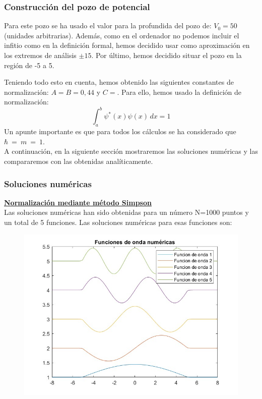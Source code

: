 \documentclass[12pt]{article}
\begin{document}
\subsubsection{Construcción del pozo de potencial}
Para este pozo se ha usado el valor para la profundida del pozo
de: $V_0=50$ (unidades arbitrarias). Además, como en el ordenador
no podemos incluir el infitio como en la definición formal, hemos 
decidido usar como aproximación en los extremos de análisis $\pm 15$.
Por último, hemos decidido situar el pozo en la región de -5 a 5. \\
\par
Teniendo todo esto en cuenta, hemos obtenido las siguientes constantes
de normalización: $A=B=0,44$ y $C=$. Para ello, hemos usado la definición
de normalización:
\begin{equation}
\int_{a}^{b} \psi^{*}(x) \psi(x) \,dx=1
\end{equation}
Un apunte importante es que para todos los cálculos se ha considerado
que $\hbar~=~m~=~1$. \\

A continuación, en la siguiente sección mostraremos las soluciones numéricas 
y las compararemos con las obtenidas analíticamente.

\subsubsection{Soluciones numéricas}

\textbf{\underline{Normalización mediante método Simpson}}\\

Las soluciones numéricas han sido obtenidas para un número 
N=1000 puntos y un total de 5 funciones. Las soluciones numéricas
para esas funciones son: 

\begin{figure}[H]
    \centering
    \includegraphics[scale=0.5]{numericas.jpg}
\end{figure}
\end{document}
